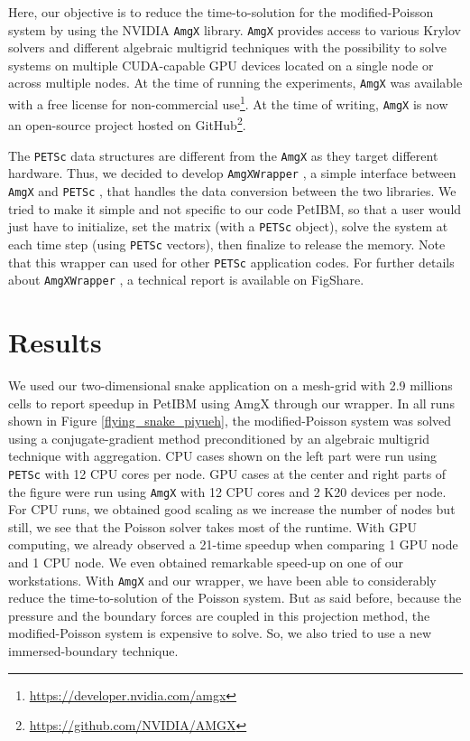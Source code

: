 \documentclass[10pt]{article}
\newcommand{\petsc}{\texttt{PETSc} }
\newcommand{\amgx}{\texttt{AmgX} }
\newcommand{\amgxwrapper}{\texttt{AmgXWrapper} }
\begin{document}
Here, our objective is to reduce the time-to-solution for the modified-Poisson system by using the NVIDIA \amgx library.
\amgx provides access to various Krylov solvers and different algebraic multigrid techniques with the possibility to solve systems on multiple CUDA-capable GPU devices located on a single node or across multiple nodes.
At the time of running the experiments, \amgx was available with a free license for non-commercial use\footnote{\url{https://developer.nvidia.com/amgx}}.
At the time of writing, \amgx is now an open-source project hosted on GitHub\footnote{\url{https://github.com/NVIDIA/AMGX}}.

The \petsc data structures are different from the \amgx as they target different hardware.
Thus, we decided to develop \amgxwrapper\cite{Chuang_Barba_2017}, a simple interface between \amgx and \petsc, that handles the data conversion between the two libraries.
We tried to make it simple and not specific to our code PetIBM, so that a user would just have to initialize, set the matrix (with a \petsc object), solve the system at each time step (using \petsc vectors), then finalize to release the memory.
Note that this wrapper can used for other \petsc application codes.
For further details about \amgxwrapper, a technical report is available on FigShare\cite{Chuang_Barba_2017_b}.

\section{Results}

We used our two-dimensional snake application on a mesh-grid with 2.9 millions cells to report speedup in PetIBM using AmgX through our wrapper.
In all runs shown in Figure \ref{flying_snake_piyueh}, the modified-Poisson system was solved using a conjugate-gradient method preconditioned by an algebraic multigrid technique with aggregation.
CPU cases shown on the left part were run using \petsc with 12 CPU cores per node.
GPU cases at the center and right parts of the figure were run using \amgx with 12 CPU cores and 2 K20 devices per node.
For CPU runs, we obtained good scaling as we increase the number of nodes but still, we see that the Poisson solver takes most of the runtime.
With GPU computing, we already observed a 21-time speedup when comparing 1 GPU node and 1 CPU node.
We even obtained remarkable speed-up on one of our workstations.
With \amgx and our wrapper, we have been able to considerably reduce the time-to-solution of the Poisson system.
But as said before, because the pressure and the boundary forces are coupled in this projection method, the modified-Poisson system is expensive to solve.
So, we also tried to use a new immersed-boundary technique.
\end{document}
